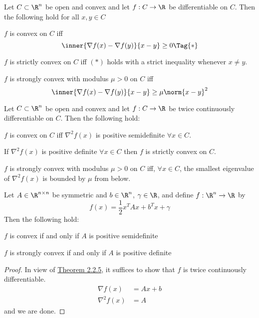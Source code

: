 Let $C\subset\R^n$ be open and convex and let $f:C\to\R$ be differentiable on
$C$. Then the following hold for all $x,y\in C$
\begin{enumerata}
  \item $f$ is convex on $C$ iff
  \begin{equation*}
    \inner{\nabla f(x)-\nabla f(y)}{x-y}\geq0\Tag{*}
  \end{equation*}
  \item $f$ is strictly convex on $C$ iff $(*)$ holds with a strict
  inequality whenever $x\neq y$.
  \item $f$ is strongly convex with modulus $\mu>0$ on $C$ iff
  $$
    \inner{\nabla f(x)-\nabla f(y)}{x-y}\geq\mu\norm{x-y}^2
  $$
\end{enumerata}

\label{eeb9c30}

Let $C\subset\R^n$ be open and convex and let $f:C\to\R$ be twice continuously
differentiable on $C$. Then the following hold:
\begin{enumerata}
  \def\allx{\forall x\in C}
  \def\hessian{\nabla^2f(x)}
  \item $f$ is convex on $C$ iff $\hessian$ is positive
  semidefinite $\allx$.
  \item If $\hessian$ is positive definite $\allx$ then $f$ is strictly convex on $C$.
  \item $f$ is strongly convex with modulus $\mu>0$ on $C$ iff,
  $\allx$, the smallest eigenvalue of $\hessian$ is bounded by $\mu$
  from below.
\end{enumerata}

\label{de25005}

Let $A\in\R^{n\times n}$ be symmetric and $b\in\R^n$, $\gamma\in\R$, and define
$f:\R^n\to\R$ by
$$
  f(x)=\frac12x^TAx+b^Tx+\gamma
$$
Then the following hold:
\begin{enumerata}
  \item $f$ is convex if and only if $A$ is positive semidefinite
  \item $f$ is strongly convex if and only if $A$ is positive definite
\end{enumerata}

\begin{proof}

  In view of \href{eeb9c30}{Theorem 2.2.5}, it suffices to show that $f$ is twice
  continuously differentiable.
  \begin{align*}
    \nabla f(x)  & = Ax + b \\
    \nabla^2f(x) & = A
  \end{align*}
  and we are done.
\end{proof}

